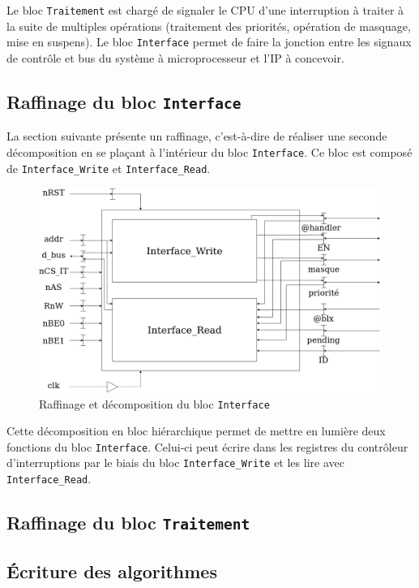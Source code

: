 Le bloc \texttt{Traitement} est chargé de signaler le CPU d'une interruption à traiter à la suite de multiples opérations (traitement des priorités, opération de masquage, mise en suspens). Le bloc \texttt{Interface} permet de faire la jonction entre les signaux de contrôle et bus du système à microprocesseur et l'IP à concevoir. 

\newpage

\subsection{Raffinage du bloc \texttt{Interface}}

La section suivante présente un raffinage, c'est-à-dire de réaliser une seconde décomposition en se plaçant à l'intérieur du bloc \texttt{Interface}. Ce bloc est composé de \texttt{Interface\_Write} et \texttt{Interface\_Read}. 

\begin{figure}[H]
	\centering
	\includegraphics[width=0.9\linewidth]{figure/raffinage_interface.png}
	\caption{Raffinage et décomposition du bloc \texttt{Interface}}
	\label{fig:raffinage_interface}
\end{figure}

Cette décomposition en bloc hiérarchique permet de mettre en lumière deux fonctions du bloc \texttt{Interface}. Celui-ci peut écrire dans les registres du contrôleur d'interruptions par le biais du bloc \texttt{Interface\_Write} et les lire avec \texttt{Interface\_Read}.

\subsection{Raffinage du bloc \texttt{Traitement}}

\newpage

\subsection{Écriture des algorithmes}

